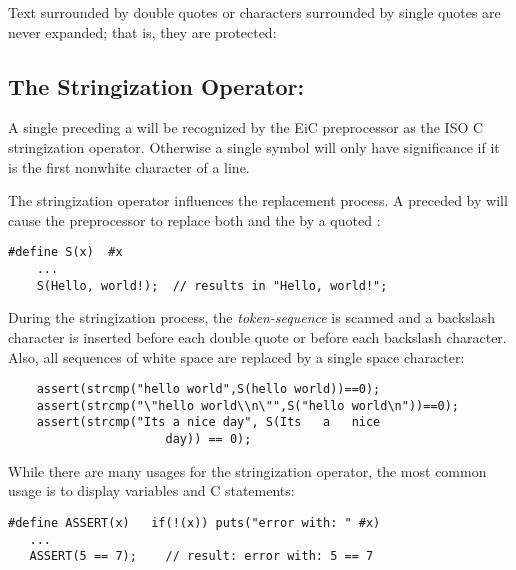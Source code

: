Text surrounded by double quotes or characters surrounded by single
quotes are never expanded; that is, they are protected:

\subsection{The Stringization Operator: \T{\#}}
\label{sec:Stringization} 

A single \T{\#} preceding a  will be recognized by the EiC
preprocessor as the ISO C stringization operator. Otherwise a single
\T{\#} symbol will only have significance if it is the first nonwhite 
character of a line. 

The stringization operator influences the replacement process.  A
 preceded by \T{\#} will cause the preprocessor
to replace both  \T{\#} and the  by a quoted
:


\begin{production}
\begin{verbatim}
#define S(x)  #x    
	...
	S(Hello, world!);  // results in "Hello, world!";
\end{verbatim}
\end{production}

During the stringization process, the {\it token-sequence} is scanned
and a backslash character is inserted before each double quote
or before each backslash character. Also, all sequences of white space are
replaced by a single space character:
\begin{production}
\begin{verbatim}
    assert(strcmp("hello world",S(hello world))==0);
    assert(strcmp("\"hello world\\n\"",S("hello world\n"))==0);
    assert(strcmp("Its a nice day", S(Its   a   nice
				      day)) == 0);
\end{verbatim}
\end{production}

While there are many usages for the stringization operator, the most
common usage is to display variables and C statements:

\begin{production}
\begin{verbatim}
#define ASSERT(x)   if(!(x)) puts("error with: " #x)
   ...
   ASSERT(5 == 7);    // result: error with: 5 == 7
\end{verbatim}
\end{production}


